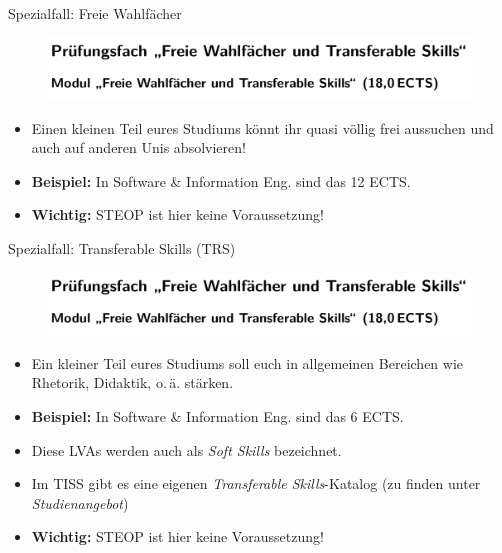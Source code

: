 \documentclass{beamer}
\begin{document}
\begin{frame}{Spezialfall: Freie Wahlfächer}
    \begin{figure}[htp]
        \includegraphics[width=1.0\textwidth]{pruefungsfach3.png}
    \end{figure}
    \begin{itemize}
        \item Einen kleinen Teil eures Studiums könnt ihr quasi völlig frei
              aussuchen und auch auf anderen Unis absolvieren!
        \item \textbf{Beispiel:} In Software \& Information Eng. sind das 12 ECTS.
        \item \textbf{Wichtig:} STEOP ist hier keine Voraussetzung!
    \end{itemize}
\end{frame}

\begin{frame}{Spezialfall: Transferable Skills (TRS)}
    \begin{figure}[htp]
        \includegraphics[width=1.0\textwidth]{pruefungsfach3.png}
    \end{figure}
    \begin{itemize}
        \item Ein kleiner Teil eures Studiums soll euch in allgemeinen
              Bereichen wie Rhetorik, Didaktik, o.\,ä. stärken.
        \item \textbf{Beispiel:} In Software \& Information Eng. sind das 6 ECTS.
        \item Diese LVAs werden auch als \textit{Soft Skills} bezeichnet.
        \item Im TISS gibt es eine eigenen \textit{Transferable
              Skills}-Katalog (zu finden unter \textit{Studienangebot})
        \item \textbf{Wichtig:} STEOP ist hier keine Voraussetzung!
    \end{itemize}
\end{frame}
\end{document}

